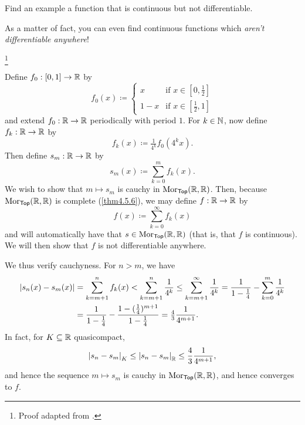 \begin{exr}
Find an example a function that is continuous but not differentiable.
\end{exr}
As a matter of fact, you can even find continuous functions which \emph{aren't differentiable anywhere}!
\begin{exm}\footnote{Proof adapted from \cite{Coleman}.}\label{exm6.3.4}
\begin{savenotes}
Define $f_0:[0,1]\rightarrow \mathbb{R}$ by
\begin{equation}
f_0(x)\coloneqq \begin{cases}x & \text{if }x\in [0,\tfrac{1}{2}] \\ 1-x & \text{if }x\in [\tfrac{1}{2},1]\end{cases}
\end{equation}
and extend $f_0:\mathbb{R} \rightarrow \mathbb{R}$ periodically with period $1$.  For $k\in \mathbb{N}$, now define $f_k:\mathbb{R} \rightarrow \mathbb{R}$ by
\begin{equation}
f_k(x)\coloneqq \tfrac{1}{4^k}f_0(4^kx).
\end{equation}
Then define $s_m:\mathbb{R} \rightarrow \mathbb{R}$ by
\begin{equation}
s_m(x)\coloneqq \sum _{k=0}^mf_k(x).
\end{equation}
We wish to show that $m\mapsto s_m$ is cauchy in $\operatorname{Mor} _{\mathsf{Top}}(\mathbb{R},\mathbb{R} )$.    Then, because $\operatorname{Mor} _{\mathsf{Top}}(\mathbb{R} ,\mathbb{R} )$ is complete (\cref{thm4.5.6}), we may define $f:\mathbb{R} \rightarrow \mathbb{R}$ by
\begin{equation}
f(x)\coloneqq \sum _{k=0}^\infty f_k(x)
\end{equation}
and will automatically have that $s\in \operatorname{Mor} _{\mathsf{Top}}(\mathbb{R} ,\mathbb{R} )$ (that is, that $f$ is continuous).  We will then show that $f$ is not differentiable anywhere.

We thus verify cauchyness.  For $n>m$, we have
\begin{equation}
\begin{split}
\lvert s_n(x)-s_m(x)\rvert & =\sum _{k=m+1}^nf_k(x)<\sum _{k=m+1}^n\frac{1}{4^k}\leq \sum _{k=m+1}^\infty \frac{1}{4^k}=\frac{1}{1-\tfrac{1}{4}}-\sum _{k=0}^m\frac{1}{4^k} \\
& =\frac{1}{1-\tfrac{1}{4}}-\frac{1-(\tfrac{1}{4})^{m+1}}{1-\tfrac{1}{4}}=\tfrac{4}{3}\frac{1}{4^{m+1}}.
\end{split}
\end{equation}
In fact, for $K\subseteq \mathbb{R}$ quasicompact,
\begin{equation}
\norm[s_n-s_m]_K\leq \norm[s_n-s_m]_{\R}\leq \frac{4}{3}\frac{1}{4^{m+1}},
\end{equation}
and hence the sequence $m\mapsto s_m$ is cauchy in $\operatorname{Mor} _{\mathsf{Top}}(\mathbb{R} ,\mathbb{R} )$, and hence converges to $f$.


\end{savenotes}
\end{exm}
